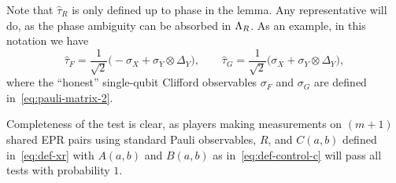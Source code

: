 Note that $\hat{\tau}_R$ is only defined up to phase in the lemma. Any representative will do, as  the phase ambiguity can be absorbed in $\Lambda_R$. As an example, in this notation we have 
\begin{equation}\label{eq:hat-tau-def}
\hat{\tau}_F = \frac{1}{\sqrt{2}}\big(-\sigma_X + \sigma_Y \otimes \Delta_Y\big),\qquad \hat{\tau}_G = \frac{1}{\sqrt{2}}\big(\sigma_X + \sigma_Y \otimes \Delta_Y\big),
\end{equation}
where the ``honest'' single-qubit Clifford observables $\sigma_F$ and $\sigma_G$ are defined in~\eqref{eq:pauli-matrix-2}.

 Completeness of the test is clear, as players making measurements on $(m+1)$ shared EPR pairs using standard Pauli observables, $R$, and $C(a,b)$ defined in~\eqref{eq:def-xr} with $A(a,b)$ and $B(a,b)$ as in~\eqref{eq:def-control-c} will pass all tests with probability $1$.  %

